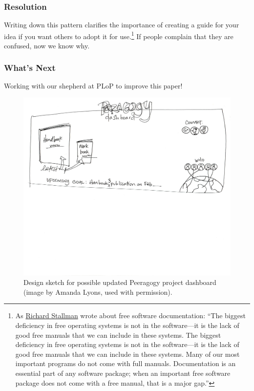 \subsubsection*{Resolution}
Writing down this pattern clarifies the importance of creating a guide for your idea if you want others to adopt it for use.\footnote{As \href{https://www.gnu.org/philosophy/free-doc.html}{Richard Stallman} wrote about free software documentation: ``The biggest deficiency in free operating systems is not in the software—it is the lack of good free manuals that we can include in these systems. The biggest deficiency in free operating systems is not in the software—it is the lack of good free manuals that we can include in these systems. Many of our most important programs do not come with full manuals. Documentation is an essential part of any software package; when an important free software package does not come with a free manual, that is a major gap.''}  If people complain that they are confused, now we know why.

\subsubsection*{What's Next} 
Working with our shepherd at PLoP to improve this paper!


\begin{figure}
\includegraphics[width=\textwidth,trim=0mm 135mm 0mm 0mm,clip=true]{figures/peeragogy_dashboard_draft1/peeragogy_dashboard_draft1.jpg}
\caption{Design sketch for possible updated Peeragogy project dashboard (image by Amanda Lyons, used with permission).}
\end{figure}
